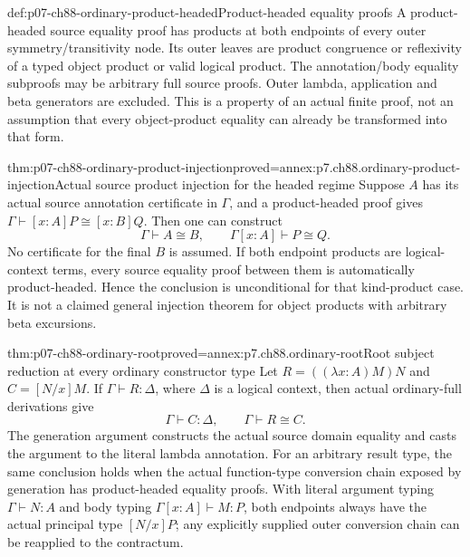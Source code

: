\begin{hbdefinition}{def:p07-ch88-ordinary-product-headed}{Product-headed equality proofs}
A product-headed source equality proof has products at both endpoints
of every outer symmetry/transitivity node. Its outer leaves are product
congruence or reflexivity of a typed object product or valid logical
product. The annotation/body equality subproofs may be arbitrary full
source proofs. Outer lambda, application and beta generators are excluded.
This is a property of an actual finite proof, not an assumption that
every object-product equality can already be transformed into that form.
\end{hbdefinition}

\begin{hbtheorem}{thm:p07-ch88-ordinary-product-injection}{proved=annex:p7.ch88.ordinary-product-injection}{Actual source product injection for the headed regime}
Suppose \(A\) has its actual source annotation certificate in
\(\Gamma\), and a product-headed proof gives
\(\Gamma\vdash[x:A]P\cong[x:B]Q\). Then one can construct
\[
 \Gamma\vdash A\cong B,\qquad
 \Gamma[x:A]\vdash P\cong Q.
\]
No certificate for the final \(B\) is assumed. If both endpoint
products are logical-context terms, every source equality proof between
them is automatically product-headed. Hence the conclusion is
unconditional for that kind-product case. It is not a claimed general
injection theorem for object products with arbitrary beta excursions.
\end{hbtheorem}

\begin{hbtheorem}{thm:p07-ch88-ordinary-root}{proved=annex:p7.ch88.ordinary-root}{Root subject reduction at every ordinary constructor type}
Let \(R=((\lambda x:A)M)N\) and \(C=[N/x]M\).
If \(\Gamma\vdash R:\Delta\), where \(\Delta\) is a logical
context, then actual ordinary-full derivations give
\[
 \Gamma\vdash C:\Delta,\qquad\Gamma\vdash R\cong C.
\]
The generation argument constructs the actual source domain
equality and casts the argument to the literal lambda annotation.
For an arbitrary result type, the same conclusion holds when the actual
function-type conversion chain exposed by generation has product-headed
equality proofs. With literal argument typing \(\Gamma\vdash N:A\)
and body typing \(\Gamma[x:A]\vdash M:P\), both endpoints always
have the actual principal type \([N/x]P\); any explicitly supplied
outer conversion chain can be reapplied to the contractum.
\end{hbtheorem}

